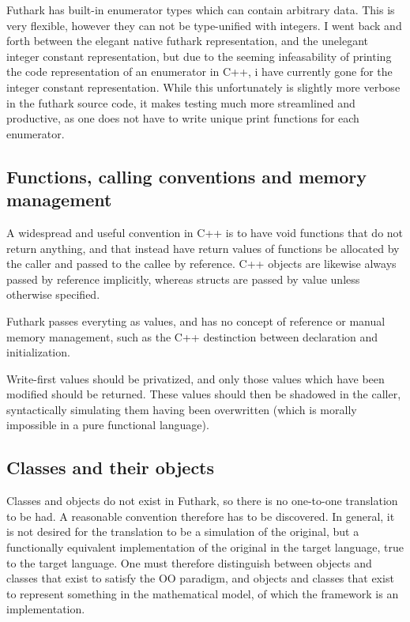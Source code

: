 Futhark has built-in enumerator types which can contain arbitrary data. This is very flexible, however they can not be type-unified with integers. I went back and forth between the elegant native futhark representation, and the unelegant integer constant representation, but due to the seeming infeasability of printing the code representation of an enumerator in C++, i have currently gone for the integer constant representation. While this unfortunately is slightly more verbose in the futhark source code, it makes testing much more streamlined and productive, as one does not have to write unique print functions for each enumerator.

\subsection{Functions, calling conventions and memory management}
A widespread and useful convention in C++ is to have void functions that do not return anything, and that instead have return values of functions be allocated by the caller and passed to the callee by reference. C++ objects are likewise always passed by reference implicitly, whereas structs are passed by value unless otherwise specified.

Futhark passes everyting as values, and has no concept of reference or manual memory management, such as the C++ destinction between declaration and initialization.

Write-first values should be privatized, and only those values which have been modified should be returned. These values should then be shadowed in the caller, syntactically simulating them having been overwritten (which is morally impossible in a pure functional language).

\subsection{Classes and their objects}
Classes and objects do not exist in Futhark, so there is no one-to-one translation to be had. A reasonable convention therefore has to be discovered. In general, it is not desired for the translation to be a simulation of the original, but a functionally equivalent implementation of the original in the target language, true to the target language. One must therefore distinguish between objects and classes that exist to satisfy the OO paradigm, and objects and classes that exist to represent something in the mathematical model, of which the framework is an implementation.

